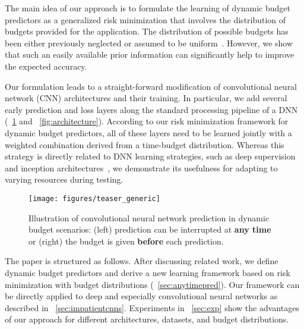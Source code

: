 \documentclass{bmvc2k}
\begin{document}
The main idea of our approach is to formulate the learning of dynamic budget predictors as a generalized risk minimization that involves
the distribution of budgets provided for the application. The distribution of possible budgets has been either previously neglected
or assumed to be uniform~\cite{karayev2014anytime}. However, we show that such an easily available prior information
can significantly help to improve the expected accuracy.

Our formulation leads to a straight-forward modification of convolutional neural network (CNN)
architectures and their training. In particular, we add several early prediction and loss layers along the standard processing pipeline of a DNN (\figurename~\ref{fig:teaser} and \figurename~\ref{fig:architecture}).
According to our risk minimization framework for dynamic budget predictors, all of these layers need to be learned jointly with a weighted combination derived from a time-budget distribution. Whereas this strategy is directly related to DNN learning strategies, such as deep supervision~\cite{wang2015training} and
inception architectures~\cite{szegedy2015going}, we demonstrate its usefulness for adapting to varying resources during testing.

\begin{figure}
    \centering
    \texttt{[image: figures/teaser\_generic]}
    \caption{Illustration of convolutional neural network prediction in dynamic budget scenarios: (left) prediction can be interrupted at \textbf{any time} or (right) the budget is given \textbf{before} each prediction.}
    \label{fig:teaser}
\end{figure}

The paper is structured as follows. After discussing related work, we define dynamic budget
predictors and derive a new learning framework based on risk minimization with budget distributions
(\sectionname~\ref{sec:anytimepred}). Our framework can be directly applied to deep and especially convolutional neural networks
as described in \sectionname~\ref{sec:impatientcnns}. Experiments in \sectionname~\ref{sec:exp} show
the advantages of our approach for different architectures, datasets, and budget distributions.
\end{document}
